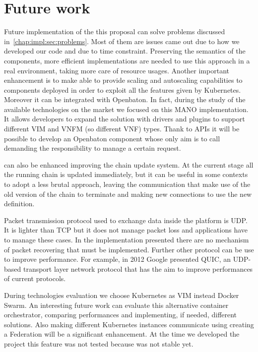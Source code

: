 \chapter{Future work}
\label{chap:future}

Future implementation of the this proposal can solve problems discussed
in~\ref{chap:impl:sec:problems}. Most of them are issues came out due to how we
developed our code and due to time constraint. Preserving the semantics of the
components, more efficient implementations are needed to use this approach in
a real environment, taking more care of resource usages. Another important
enhancement is to make \harbor{} able to provide scaling and autoscaling
capabilities to components deployed in order to exploit all the features given
by Kubernetes. Moreover it can be integrated with Openbaton. In fact, during the
study of the available technologies on the market we focused on this MANO
implementation. It allows developers to expand the solution with drivers and
plugins to support different VIM and VNFM (so different VNF) types. Thank to
\harbor{} APIs it will be possible to develop an Openbaton component whose only
aim is to call \harbor{} demanding the responsibility to manage a certain
request. 

\harbor{} can also be enhanced improving the chain update system. At the current
stage all the running chain is updated immediately, but it can be useful in some
contexts to adopt a less brutal approach, leaving the communication that make use
of the old version of the chain to terminate and making new connections to use
the new definition.

Packet transmission protocol used to exchange data inside the platform is UDP.
It is lighter than TCP but it does not manage packet loss and applications have
to manage these cases. In the implementation presented there are no mechanism of
packet recovering that must be implemented. Further other protocol can be use to
improve performance. For example, in 2012 Google presented QUIC, an UDP-based
transport layer network protocol that has the aim to improve performances of
current protocols. 

During technologies evaluation we choose Kubernetes as VIM instead Docker Swarm.
An interesting future work can evaluate this alternative container
orchestrator, comparing performances and implementing, if needed, different
solutions. Also making different Kubernetes instances communicate using creating
a Federation will be a significant enhancement. At the time we developed the
project this feature was not tested because was not stable yet.

